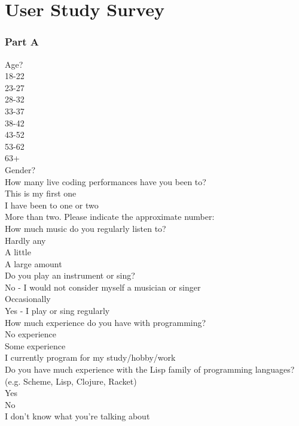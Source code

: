 \chapter{User Study Survey}

\subsection*{Part A}

Age?\\
18-22\\
23-27\\
28-32\\
33-37\\
38-42\\
43-52\\
53-62\\
63+\\

Gender?   \underline{\hspace{3cm}}\\

How many live coding performances have you been to?\\
This is my first one\\
I have been to one or two\\
More than two. Please indicate the approximate number:   \underline{\hspace{3cm}}\\

How much music do you regularly listen to?\\
Hardly any\\
A little\\
A large amount\\

Do you play an instrument or sing?\\
No - I would not consider myself a musician or singer\\
Occasionally\\
Yes - I play or sing regularly\\

How much experience do you have with programming?\\
No experience\\
Some experience\\
I currently program for my study/hobby/work\\

Do you have much experience with the Lisp family of programming languages? (e.g. Scheme, Lisp, Clojure, Racket)\\
Yes\\
No\\
I don’t know what you’re talking about\\

